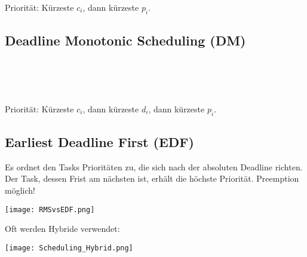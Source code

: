 Priorität: Kürzeste $c_i$, dann kürzeste $p_i$.


\subsection{Deadline Monotonic Scheduling (DM)}

\begin{minipage}[t]{.49\linewidth}
    \vspace{0pt}
\end{minipage}\hfill
\begin{minipage}[t]{.49\linewidth}
    \vspace{0pt}
    \\
    \\
    \\
\end{minipage}

Priorität: Kürzeste $c_i$, dann kürzeste $d_i$, dann kürzeste $p_i$.

\subsection{Earliest Deadline First (EDF)}

Es ordnet den Tasks Prioritäten zu, die sich nach der absoluten Deadline richten. Der Task, dessen Frist am nächsten ist, erhält die höchste Priorität.
Preemption möglich!

\begin{center}
    \texttt{[image: RMSvsEDF.png]}
\end{center}


Oft werden Hybride verwendet:
\begin{center}
    \texttt{[image: Scheduling\_Hybrid.png]}
\end{center}
